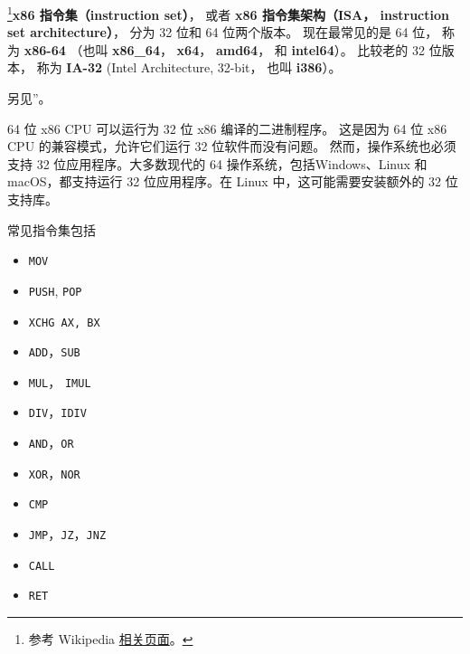 
\begin{issues}
\issueDraft
\end{issues}

\footnote{参考 Wikipedia \href{https://en.wikipedia.org/wiki/X86-64}{相关页面}。}\textbf{x86 指令集（instruction set）}， 或者 \textbf{x86 指令集架构（ISA， instruction set architecture）}， 分为 32 位和 64 位两个版本。 现在最常见的是 64 位， 称为 \textbf{x86-64} （也叫 \textbf{x86_64}， \textbf{x64}， \textbf{amd64}， 和 \textbf{intel64}）。 比较老的 32 位版本， 称为 \textbf{IA-32} (Intel Architecture, 32-bit， 也叫 \textbf{i386}）。

另见”。

64 位 x86 CPU 可以运行为 32 位 x86 编译的二进制程序。 这是因为 64 位 x86 CPU 的兼容模式，允许它们运行 32 位软件而没有问题。 然而，操作系统也必须支持 32 位应用程序。大多数现代的 64 操作系统，包括Windows、Linux 和 macOS，都支持运行 32 位应用程序。在 Linux 中，这可能需要安装额外的 32 位支持库。

常见指令集包括
\begin{itemize}
\item \verb`MOV`
\item \verb`PUSH`, \verb`POP`
\item \verb`XCHG AX, BX`
\end{itemize}

\begin{itemize}
\item \verb`ADD`，\verb`SUB`
\item \verb`MUL`， \verb`IMUL`
\item \verb`DIV`，\verb`IDIV`
\end{itemize}

\begin{itemize}
\item \verb`AND`，\verb`OR`
\item \verb`XOR`，\verb`NOR`
\end{itemize}

\begin{itemize}
\item \verb`CMP`
\item \verb`JMP`，\verb`JZ`，\verb`JNZ`
\item \verb`CALL`
\item \verb`RET`
\end{itemize}
